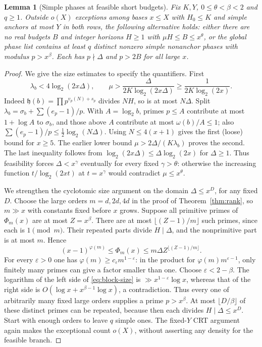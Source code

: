 \documentclass[11pt,a4paper]{article}
\newtheorem{lemma}[theorem]{Lemma}
\theoremstyle{definition}\newtheorem{question}[theorem]{Question}
\theoremstyle{remark}\newtheorem{remark}[theorem]{Remark}
\newcommand{\hh}{\mathfrak h}\newcommand{\ee}{\mathrm e}
\begin{document}
\begin{lemma}[Simple phases at feasible short budgets]\label{lem:short}
Fix $K,Y$, $0\le\theta<\beta<2$ and $q\ge1$. Outside $o(X)$
exceptions among bases $x\le X$ with $H_0\le K$ and simple anchors
at most $Y$ in both rows, the following alternative holds:
either there are no real budgets $B$ and integer horizons $H\ge1$
with $\mu H\le B\le x^\theta$, or the global phase list contains at
least $q$ distinct nonzero simple nonanchor phases with modulus
$p>x^\beta$. Each has $p\nmid\Delta$ and $p>2B$ for all large $x$.
\end{lemma}
\begin{proof}
We give the size estimates to specify the quantifiers. First
\begin{equation}\label{eq:logdrift}
 \lambda_b<4\log_2(2x\Delta),\qquad
 \mu>\frac{\Delta}{2K\log_2(2x\Delta)}
       \ge\frac1{2K\log_2(2x)}.
\end{equation}
Indeed $\hh(b)=\prod p^{v_p(N)+s_p}$ divides $N H$, so is at most
$N\Delta$. Split $\lambda_b=\sigma_b+\sum(e_p-1)/p$.
With $A=\log_2 b$, primes $p\le A$ contribute at most
$1+\log A$ to $\sigma_b$, and those above $A$ contribute at most
$\omega(b)/A\le1$; also
$\sum(e_p-1)/p\le\tfrac12\log_2(N\Delta)$.
Using $N\le4(x+1)$ gives the first (loose) bound for $x\ge5$.
The earlier lower bound $\mu>2\Delta/(K\lambda_b)$ proves the
second. The last inequality follows from
$\log_2(2x\Delta)\le\Delta\log_2(2x)$ for $\Delta\ge1$.
Thus feasibility forces $\Delta<x^\gamma$ eventually for every
fixed $\gamma>\theta$: otherwise the increasing function
$t/\log_2(2xt)$ at $t=x^\gamma$ would contradict $\mu\le x^\theta$.

We strengthen the cyclotomic size argument on the domain
$\Delta\le x^D$, for any fixed $D$. Choose the large orders
$m=d,2d,4d$ in the proof of Theorem~\ref{thm:rank}, so $m\gg x$
with constants fixed before $x$ grows. Suppose all primitive primes
of $\Phi_m(x)$ are at most $Z=x^\beta$.
There are at most $\lfloor(Z-1)/m\rfloor$ such primes, since each
is $1\pmod m$. Their repeated parts divide $H\mid\Delta$,
and the nonprimitive part is at most $m$. Hence
\begin{equation}\label{eq:block-size}
 (x-1)^{\varphi(m)}\le\Phi_m(x)
       \le m\Delta Z^{\lfloor(Z-1)/m\rfloor}.
\end{equation}
For every $\varepsilon>0$ one has
$\varphi(m)\ge c_\varepsilon m^{1-\varepsilon}$: in the product
for $\varphi(m)m^{\varepsilon-1}$, only finitely many primes can
give a factor smaller than one. Choose $\varepsilon<2-\beta$.
The logarithm of the left side of \eqref{eq:block-size} is
$\gg x^{1-\varepsilon}\log x$, whereas that of the right side is
$O(\log x+x^{\beta-1}\log x)$, a contradiction.
Thus every one of arbitrarily many fixed large orders supplies a
prime $p>x^\beta$. At most $\lfloor D/\beta\rfloor$ of these
distinct primes can be repeated, because then each divides
$H\mid\Delta\le x^D$. Start with enough orders to leave $q$ simple
ones. The fixed-$Y$ CRT argument again makes the exceptional count
$o(X)$, without asserting any density for the feasible branch.


\end{proof}
\end{document}

